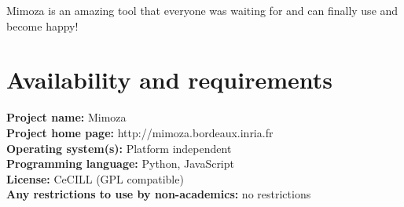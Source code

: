 \documentclass{bmcart}
\begin{document}
Mimoza is an amazing tool that everyone was waiting for and can finally use and become happy!

\section*{Availability and requirements}
\textbf{Project name:} Mimoza\\
\textbf{Project home page:} http://mimoza.bordeaux.inria.fr\\
\textbf{Operating system(s):} Platform independent\\
\textbf{Programming language:} Python, JavaScript\\
\textbf{License:} CeCILL (GPL compatible)\\
\textbf{Any restrictions to use by non-academics:} no restrictions

\end{document}

